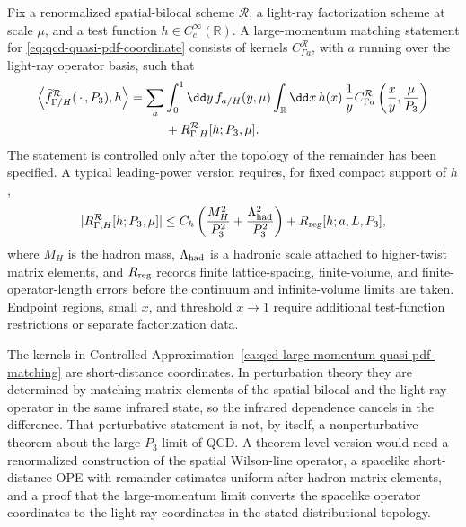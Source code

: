 \begin{controlledapproximation}
\label{ca:qcd-large-momentum-quasi-pdf-matching}
Fix a renormalized spatial-bilocal scheme \(\mathcal R\), a light-ray
factorization scheme at scale \(\mu\), and a test function
\(h\in C_c^\infty(\mathbb R)\).  A large-momentum matching statement for
\eqref{eq:qcd-quasi-pdf-coordinate} consists of kernels
\(C_{\Gamma a}^{\mathcal R}\), with \(a\) running over the light-ray operator
basis, such that
\begin{align}
  \left\langle
  \widetilde f_{\Gamma/H}^{\mathcal R}(\,\cdot\,,P_3),h
  \right\rangle
  &=
  \sum_a\int_0^1\dd y\, f_{a/H}(y,\mu)
  \int_{\mathbb R}\dd x\,h(x)\,
  \frac1y
  C_{\Gamma a}^{\mathcal R}
  \left(\frac{x}{y},\frac{\mu}{P_3}\right)
  \notag\\
  &\hspace{1.0cm}
  +R_{\Gamma,H}^{\mathcal R}[h;P_3,\mu].
  \label{eq:qcd-quasi-pdf-matching-distributional}
\end{align}
The statement is controlled only after the topology of the remainder has been
specified.  A typical leading-power version requires, for fixed compact
support of \(h\),
\begin{equation}
  |R_{\Gamma,H}^{\mathcal R}[h;P_3,\mu]|
  \le
  C_h
  \left(
    \frac{M_H^2}{P_3^2}
    +\frac{\Lambda_{\rm had}^2}{P_3^2}
  \right)
  +
  R_{\rm reg}[h;a,L,P_3],
  \label{eq:qcd-quasi-pdf-power-remainder}
\end{equation}
where \(M_H\) is the hadron mass, \(\Lambda_{\rm had}\) is a hadronic scale
attached to higher-twist matrix elements, and \(R_{\rm reg}\) records finite
lattice-spacing, finite-volume, and finite-operator-length errors before the
continuum and infinite-volume limits are taken.  Endpoint regions, small
\(x\), and threshold \(x\to1\) require additional test-function restrictions
or separate factorization data.
\end{controlledapproximation}

The kernels in
Controlled Approximation~\ref{ca:qcd-large-momentum-quasi-pdf-matching} are
short-distance coordinates.  In perturbation theory they are determined by
matching matrix elements of the spatial bilocal and the light-ray operator in
the same infrared state, so the infrared dependence cancels in the difference.
That perturbative statement is not, by itself, a nonperturbative theorem about
the large-\(P_3\) limit of QCD.  A theorem-level version would need a
renormalized construction of the spatial Wilson-line operator, a spacelike
short-distance OPE with remainder estimates uniform after hadron matrix
elements, and a proof that the large-momentum limit converts the spacelike
operator coordinates to the light-ray coordinates in the stated distributional
topology.

